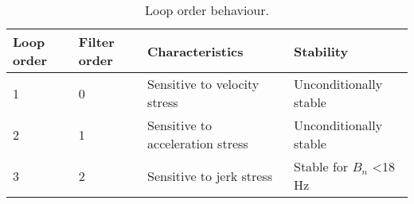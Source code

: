 \begin{table}[!htb]
\centering
\begin{tabular}{|l|l|l|l|}
\hline
\rowcolor[HTML]{C0C0C0} 
Loop order & Filter order & Characteristics & Stability                               \\ \hline
1          & 0            & Sensitive to velocity stress       & Unconditionally stable                                  \\ \hline
\rowcolor[HTML]{EFEFEF} 
2          & 1            & Sensitive to acceleration stress   & Unconditionally stable                                   \\ \hline
3          & 2            & Sensitive to jerk stress          & Stable for $B_n$ \textless 18 Hz \\ \hline
\end{tabular}
\caption{Loop order behaviour.}
\label{tab:LoopOrders}
\end{table}
